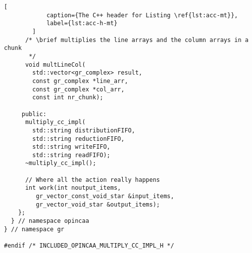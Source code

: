 \begin{lstlisting}[
		    caption={The C++ header for Listing \ref{lst:acc-mt}},
		    label={lst:acc-h-mt}
		]
      /* \brief multiplies the line arrays and the column arrays in a chunk
       */
      void multLineCol(
        std::vector<gr_complex> result,
        const gr_complex *line_arr,
        const gr_complex *col_arr,
        const int nr_chunk);

     public:
      multiply_cc_impl(
        std::string distributionFIFO,
        std::string reductionFIFO,
        std::string writeFIFO,
        std::string readFIFO);
      ~multiply_cc_impl();

      // Where all the action really happens
      int work(int noutput_items,
         gr_vector_const_void_star &input_items,
         gr_vector_void_star &output_items);
    };
  } // namespace opincaa
} // namespace gr

#endif /* INCLUDED_OPINCAA_MULTIPLY_CC_IMPL_H */
                \end{lstlisting}
